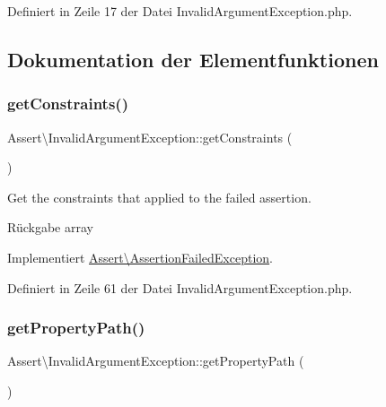 Definiert in Zeile 17 der Datei Invalid\+Argument\+Exception.\+php.



\subsection{Dokumentation der Elementfunktionen}
\mbox{\label{class_assert_1_1_invalid_argument_exception_a1c24a475f0988131f0193d74681eb121}} 
\subsubsection{\texorpdfstring{get\+Constraints()}{getConstraints()}}
{\footnotesize\ttfamily Assert\textbackslash{}\+Invalid\+Argument\+Exception\+::get\+Constraints (\begin{DoxyParamCaption}{ }\end{DoxyParamCaption})}

Get the constraints that applied to the failed assertion.

\begin{DoxyReturn}{Rückgabe}
array 
\end{DoxyReturn}


Implementiert \mbox{\hyperlink{interface_assert_1_1_assertion_failed_exception}{Assert\textbackslash{}\+Assertion\+Failed\+Exception}}.



Definiert in Zeile 61 der Datei Invalid\+Argument\+Exception.\+php.

\mbox{\label{class_assert_1_1_invalid_argument_exception_ad40878e016aa62cd12ce509db06c9882}} 
\subsubsection{\texorpdfstring{get\+Property\+Path()}{getPropertyPath()}}
{\footnotesize\ttfamily Assert\textbackslash{}\+Invalid\+Argument\+Exception\+::get\+Property\+Path (\begin{DoxyParamCaption}{ }\end{DoxyParamCaption})}

